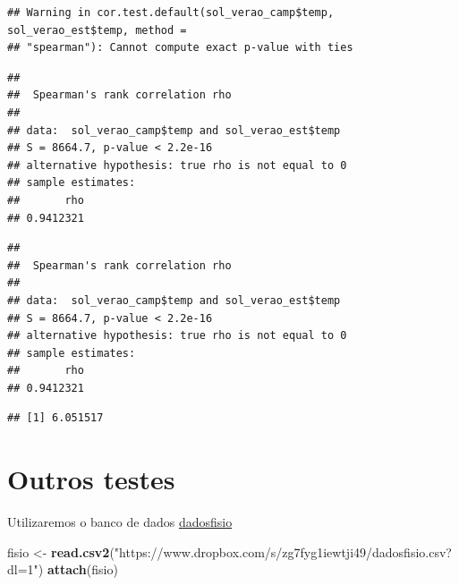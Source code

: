 \documentclass[
]{book}
\newenvironment{Shaded}{\begin{snugshade}}{\end{snugshade}}
\newcommand{\DataTypeTok}[1]{\textcolor[rgb]{0.13,0.29,0.53}{#1}}
\newcommand{\KeywordTok}[1]{\textcolor[rgb]{0.13,0.29,0.53}{\textbf{#1}}}
\newcommand{\NormalTok}[1]{#1}
\newcommand{\OperatorTok}[1]{\textcolor[rgb]{0.81,0.36,0.00}{\textbf{#1}}}
\newcommand{\StringTok}[1]{\textcolor[rgb]{0.31,0.60,0.02}{#1}}
\begin{document}
\begin{verbatim}
## Warning in cor.test.default(sol_verao_camp$temp, sol_verao_est$temp, method =
## "spearman"): Cannot compute exact p-value with ties
\end{verbatim}

\begin{verbatim}
## 
##  Spearman's rank correlation rho
## 
## data:  sol_verao_camp$temp and sol_verao_est$temp
## S = 8664.7, p-value < 2.2e-16
## alternative hypothesis: true rho is not equal to 0
## sample estimates:
##       rho 
## 0.9412321
\end{verbatim}

\begin{Shaded}
\end{Shaded}

\begin{verbatim}
## 
##  Spearman's rank correlation rho
## 
## data:  sol_verao_camp$temp and sol_verao_est$temp
## S = 8664.7, p-value < 2.2e-16
## alternative hypothesis: true rho is not equal to 0
## sample estimates:
##       rho 
## 0.9412321
\end{verbatim}

\begin{Shaded}
\end{Shaded}

\begin{verbatim}
## [1] 6.051517
\end{verbatim}

\hypertarget{outros-testes}{%
\section{Outros testes}\label{outros-testes}}

Utilizaremos o banco de dados \href{https://www.dropbox.com/s/zg7fyg1iewtji49/dadosfisio.csv?dl=0}{dadosfisio}

\begin{Shaded}
\begin{Highlighting}[]
\NormalTok{fisio <-}\StringTok{ }\KeywordTok{read.csv2}\NormalTok{(}\StringTok{"https://www.dropbox.com/s/zg7fyg1iewtji49/dadosfisio.csv?dl=1"}\NormalTok{)}
\KeywordTok{attach}\NormalTok{(fisio)}
\end{Highlighting}
\end{Shaded}
\end{document}
